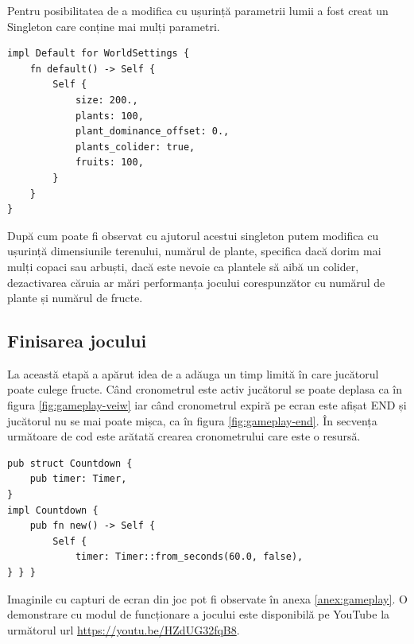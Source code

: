 Pentru posibilitatea de a modifica cu ușurință parametrii lumii a fost creat un Singleton care conține mai mulți parametri.
\begin{lstlisting}
impl Default for WorldSettings {
    fn default() -> Self {
        Self {
            size: 200.,
            plants: 100,
            plant_dominance_offset: 0.,
            plants_colider: true,
            fruits: 100,
        }
    }
}
\end{lstlisting}
După cum poate fi observat cu ajutorul acestui singleton putem modifica cu
ușurință dimensiunile terenului, numărul de plante, specifica dacă dorim mai
mulți copaci sau arbuști, dacă este nevoie ca plantele să aibă un colider,
dezactivarea căruia ar mări performanța jocului corespunzător cu numărul de
plante și numărul de fructe.

\subsection{Finisarea jocului}
La această etapă a apărut idea de a adăuga un timp limită în care jucătorul
poate culege fructe. Când cronometrul este activ jucătorul se poate deplasa ca
în figura \ref{fig:gameplay-veiw} iar când cronometrul expiră pe ecran este
afișat END și jucătorul nu se mai poate mișca, ca în figura
\ref{fig:gameplay-end}. În secvența următoare de cod este arătată crearea
cronometrului care este o resursă.
\begin{lstlisting}
pub struct Countdown {
    pub timer: Timer,
}
impl Countdown {
    pub fn new() -> Self {
        Self {
            timer: Timer::from_seconds(60.0, false),
} } }
\end{lstlisting}
Imaginile cu capturi de ecran din joc pot fi observate în anexa \ref{anex:gameplay}. O demonstrare cu modul de funcționare a jocului este disponibilă pe YouTube la următorul url \url{https://youtu.be/HZdUG32fqB8}. 
